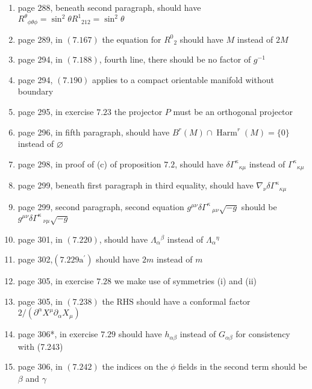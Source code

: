 \documentclass{article}
\begin{document}
\begin{enumerate}
\item page 288, beneath second paragraph, should have $R^{\theta}{}_{\phi \theta \phi}=\sin ^{2} \theta R^{1}{}_{212}=\sin ^{2} \theta$

\item page 289, in $(7.167)$ the equation for $R^{0}{}_{2}$ should have $M$ instead of $2 M$

\item page 294, in $(7.188)$, fourth line, there should be no factor of $g^{-1}$

\item page 294, $(7.190)$ applies to a compact orientable manifold without boundary

\item page 295, in exercise $7.23$ the projector $P$ must be an orthogonal projector

\item page 296, in fifth paragraph, should have $B^{r}(M) \cap \operatorname{Harm}^{r}(M)=\{0\}$ instead of $\varnothing$

\item page 298, in proof of (c) of proposition $7.2$, should have $\delta \Gamma^{\kappa}{}_{\kappa \mu}$ instead of $\Gamma^{\kappa}{}_{\kappa \mu}$

\item page 299, beneath first paragraph in third equality, should have $\nabla_\nu \delta \Gamma^{\kappa}{}_{\kappa \mu}$

\item page 299, second paragraph, second equation $g^{\mu\nu}\delta\Gamma^\kappa\,_{\mu\nu}\sqrt{-g}$ should be $g^{\mu\nu}\delta\Gamma^\kappa\,_{\nu\mu}\sqrt{-g}$

\item page 301, in $(7.220)$, should have $\Lambda_{\alpha}{ }^{\beta}$ instead of $\Lambda_{\alpha}{ }^{\eta}$

\item page 302,$ \left(7.229 \mathrm{a}^{\prime}\right)$ should have $2 m$ instead of $m$

\item page 305, in exercise $7.28$ we make use of symmetries (i) and (ii)

\item page 305, in $(7.238)$ the $\mathrm{RHS}$ should have a conformal factor $2 /\left(\partial^{\alpha} X^{\mu} \partial_{\alpha} X_{\mu}\right)$

\item page 306*, in exercise $7.29$ should have $h_{\alpha \beta}$ instead of $G_{\alpha \beta}$ for consistency with (7.243)

\item page 306, in $(7.242)$ the indices on the $\phi$ fields in the second term should be $\beta$ and $\gamma$
\end{enumerate}
\end{document}

